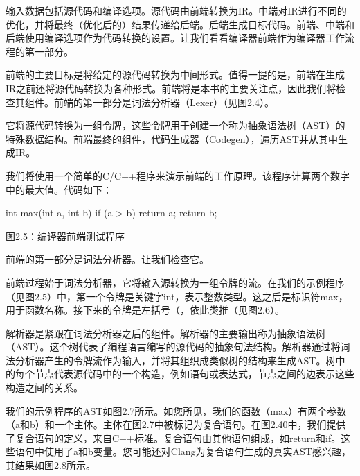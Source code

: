 
输入数据包括源代码和编译选项。源代码由前端转换为IR。中端对IR进行不同的优化，并将最终（优化后的）结果传递给后端。后端生成目标代码。前端、中端和后端使用编译选项作为代码转换的设置。让我们看看编译器前端作为编译器工作流程的第一部分。


前端的主要目标是将给定的源代码转换为中间形式。值得一提的是，前端在生成IR之前还将源代码转换为各种形式。前端将是本书的主要关注点，因此我们将检查其组件。前端的第一部分是词法分析器（Lexer）（见图2.4）。


它将源代码转换为一组令牌，这些令牌用于创建一个称为抽象语法树（AST）的特殊数据结构。前端最终的组件，代码生成器（Codegen），遍历AST并从其中生成IR。

我们将使用一个简单的C/C++程序来演示前端的工作原理。该程序计算两个数字中的最大值。代码如下：

\begin{cpp}
int max(int a, int b) {
  if (a > b)
    return a;
  return b;
}
\end{cpp}

\begin{center}
图2.5：编译器前端测试程序
\end{center}

前端的第一部分是词法分析器。让我们检查它。


前端过程始于词法分析器，它将输入源转换为一组令牌的流。在我们的示例程序（见图2.5）中，第一个令牌是关键字int，表示整数类型。这之后是标识符max，用于函数名称。接下来的令牌是左括号（，依此类推（见图2.6）。



解析器是紧跟在词法分析器之后的组件。解析器的主要输出称为抽象语法树（AST）。这个树代表了编程语言编写的源代码的抽象句法结构。解析器通过将词法分析器产生的令牌流作为输入，并将其组织成类似树的结构来生成AST。树中的每个节点代表源代码中的一个构造，例如语句或表达式，节点之间的边表示这些构造之间的关系。


我们的示例程序的AST如图2.7所示。如您所见，我们的函数（max）有两个参数（a和b）和一个主体。主体在图2.7中被标记为复合语句。在图2.40中，我们提供了复合语句的定义，来自C++标准。复合语句由其他语句组成，如return和if。这些语句中使用了a和b变量。您可能还对Clang为复合语句生成的真实AST感兴趣，其结果如图2.8所示。

